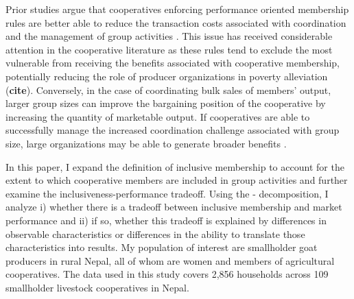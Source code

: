 \documentclass[11pt]{article}
\begin{document}
Prior studies argue that cooperatives enforcing performance oriented membership rules are better able to reduce the transaction costs associated with coordination and the management of group activities \citep{world_bank_world_2008}. This issue has received considerable attention in the cooperative literature as these rules tend to exclude the most vulnerable from receiving the benefits associated with cooperative membership, potentially reducing the role of producer organizations in poverty alleviation (\textbf{cite}). Conversely, in the case of coordinating bulk sales of members' output, larger group sizes can improve the bargaining position of the cooperative by increasing the quantity of marketable output. If cooperatives are able to successfully manage the increased coordination challenge associated with group size, large organizations may be able to generate broader benefits \citep{aflagah_cheap_2019}. %

In this paper, I expand the definition of inclusive membership to account for the extent to which cooperative members are included in group activities and further examine the inclusiveness-performance tradeoff. Using the \citet{oaxaca_male-female_1973}-\citet{blinder_wage_1973} decomposition, I analyze i) whether there is a tradeoff between inclusive membership and market performance and ii) if so, whether this tradeoff is explained by differences in observable characteristics or differences in the ability to translate those characteristics into results. My population of interest are smallholder goat producers in rural Nepal, all of whom are women and members of agricultural cooperatives. The data used in this study covers 2,856 households across 109 smallholder livestock cooperatives in Nepal. 
\end{document}

